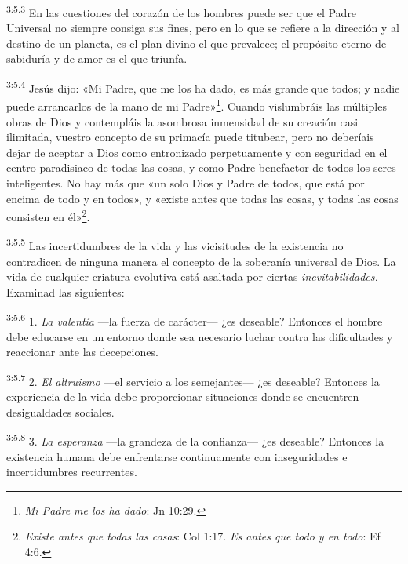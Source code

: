\par
\textsuperscript{3:5.3} En las cuestiones del corazón de los hombres puede ser que el Padre Universal no siempre consiga sus fines, pero en lo que se refiere a la dirección y al destino de un planeta, es el plan divino el que prevalece; el propósito eterno de sabiduría y de amor es el que triunfa.

\par
\textsuperscript{3:5.4} Jesús dijo: «Mi Padre, que me los ha dado, es más grande que todos; y nadie puede arrancarlos de la mano de mi Padre»\footnote{\textit{Mi Padre me los ha dado}: Jn 10:29.}. Cuando vislumbráis las múltiples obras de Dios y contempláis la asombrosa inmensidad de su creación casi ilimitada, vuestro concepto de su primacía puede titubear, pero no deberíais dejar de aceptar a Dios como entronizado perpetuamente y con seguridad en el centro paradisiaco de todas las cosas, y como Padre benefactor de todos los seres inteligentes. No hay más que «un solo Dios y Padre de todos, que está por encima de todo y en todos», y «existe antes que todas las cosas, y todas las cosas consisten en él»\footnote{\textit{Existe antes que todas las cosas}: Col 1:17. \textit{Es antes que todo y en todo}: Ef 4:6.}.

\par
\textsuperscript{3:5.5} Las incertidumbres de la vida y las vicisitudes de la existencia no contradicen de ninguna manera el concepto de la soberanía universal de Dios. La vida de cualquier criatura evolutiva está asaltada por ciertas \textit{inevitabilidades.} Examinad las siguientes:

\par
\textsuperscript{3:5.6} 1. \textit{La valentía} ---la fuerza de carácter--- ¿es deseable? Entonces el hombre debe educarse en un entorno donde sea necesario luchar contra las dificultades y reaccionar ante las decepciones.

\par
\textsuperscript{3:5.7} 2. \textit{El altruismo} ---el servicio a los semejantes--- ¿es deseable? Entonces la experiencia de la vida debe proporcionar situaciones donde se encuentren desigualdades sociales.

\par
\textsuperscript{3:5.8} 3. \textit{La esperanza} ---la grandeza de la confianza--- ¿es deseable? Entonces la existencia humana debe enfrentarse continuamente con inseguridades e incertidumbres recurrentes.

